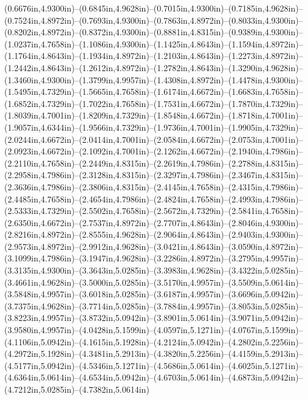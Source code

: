 (0.6676in,4.9300in)--(0.6845in,4.9628in)--(0.7015in,4.9300in)--(0.7185in,4.9628in)--(0.7524in,4.8972in)--(0.7693in,4.9300in)--(0.7863in,4.8972in)--(0.8033in,4.9300in)--(0.8202in,4.8972in)--(0.8372in,4.9300in)--(0.8881in,4.8315in)--(0.9389in,4.9300in)--(1.0237in,4.7658in)--(1.1086in,4.9300in)--(1.1425in,4.8643in)--(1.1594in,4.8972in)--(1.1764in,4.8643in)--(1.1934in,4.8972in)--(1.2103in,4.8643in)--(1.2273in,4.8972in)--(1.2442in,4.8643in)--(1.2612in,4.8972in)--(1.2782in,4.8643in)--(1.3290in,4.9628in)--(1.3460in,4.9300in)--(1.3799in,4.9957in)--(1.4308in,4.8972in)--(1.4478in,4.9300in)--(1.5495in,4.7329in)--(1.5665in,4.7658in)--(1.6174in,4.6672in)--(1.6683in,4.7658in)--(1.6852in,4.7329in)--(1.7022in,4.7658in)--(1.7531in,4.6672in)--(1.7870in,4.7329in)--(1.8039in,4.7001in)--(1.8209in,4.7329in)--(1.8548in,4.6672in)--(1.8718in,4.7001in)--(1.9057in,4.6344in)--(1.9566in,4.7329in)--(1.9736in,4.7001in)--(1.9905in,4.7329in)--(2.0244in,4.6672in)--(2.0414in,4.7001in)--(2.0584in,4.6672in)--(2.0753in,4.7001in)--(2.0923in,4.6672in)--(2.1092in,4.7001in)--(2.1262in,4.6672in)--(2.1940in,4.7986in)--(2.2110in,4.7658in)--(2.2449in,4.8315in)--(2.2619in,4.7986in)--(2.2788in,4.8315in)--(2.2958in,4.7986in)--(2.3128in,4.8315in)--(2.3297in,4.7986in)--(2.3467in,4.8315in)--(2.3636in,4.7986in)--(2.3806in,4.8315in)--(2.4145in,4.7658in)--(2.4315in,4.7986in)--(2.4485in,4.7658in)--(2.4654in,4.7986in)--(2.4824in,4.7658in)--(2.4993in,4.7986in)--(2.5333in,4.7329in)--(2.5502in,4.7658in)--(2.5672in,4.7329in)--(2.5841in,4.7658in)--(2.6350in,4.6672in)--(2.7537in,4.8972in)--(2.7707in,4.8643in)--(2.8046in,4.9300in)--(2.8216in,4.8972in)--(2.8555in,4.9628in)--(2.9064in,4.8643in)--(2.9403in,4.9300in)--(2.9573in,4.8972in)--(2.9912in,4.9628in)--(3.0421in,4.8643in)--(3.0590in,4.8972in)--(3.1099in,4.7986in)--(3.1947in,4.9628in)--(3.2286in,4.8972in)--(3.2795in,4.9957in)--(3.3135in,4.9300in)--(3.3643in,5.0285in)--(3.3983in,4.9628in)--(3.4322in,5.0285in)--(3.4661in,4.9628in)--(3.5000in,5.0285in)--(3.5170in,4.9957in)--(3.5509in,5.0614in)--(3.5848in,4.9957in)--(3.6018in,5.0285in)--(3.6187in,4.9957in)--(3.6696in,5.0942in)--(3.7375in,4.9628in)--(3.7714in,5.0285in)--(3.7884in,4.9957in)--(3.8053in,5.0285in)--(3.8223in,4.9957in)--(3.8732in,5.0942in)--(3.8901in,5.0614in)--(3.9071in,5.0942in)--(3.9580in,4.9957in)--(4.0428in,5.1599in)--(4.0597in,5.1271in)--(4.0767in,5.1599in)--(4.1106in,5.0942in)--(4.1615in,5.1928in)--(4.2124in,5.0942in)--(4.2802in,5.2256in)--(4.2972in,5.1928in)--(4.3481in,5.2913in)--(4.3820in,5.2256in)--(4.4159in,5.2913in)--(4.5177in,5.0942in)--(4.5346in,5.1271in)--(4.5686in,5.0614in)--(4.6025in,5.1271in)--(4.6364in,5.0614in)--(4.6534in,5.0942in)--(4.6703in,5.0614in)--(4.6873in,5.0942in)--(4.7212in,5.0285in)--(4.7382in,5.0614in)

